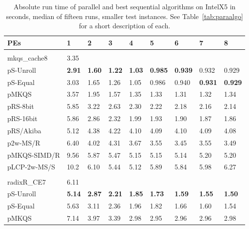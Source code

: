 \documentclass[a4paper]{myjournal}
\begin{document}
\begin{table}\centering\small
\caption{Absolute run time of parallel and best sequential algorithms on IntelX5 in seconds, median of fifteen runs, smaller test instances. See Table~\ref{tab:paraalgo} for a short description of each.}\label{tab:absrun-IntelX5b}
\begin{tabularx}{\linewidth}{l|*{8}{>{\hfill}X}|@{}}
PEs          & 1   & 2 & 3 & 4 & 5 & 6 & 7 & 8                                                                                      \\ \hline
& \multicolumn{8}{l|}{\textbf{Sinha URLs} (complete), , , } \\ \cline{2-9}
mkqs\_cache8 & 3.35 &  &  &  &  &  &  &  \\
pS-Unroll & \bf 2.91 & \bf 1.60 & \bf 1.22 & \bf 1.03 & \bf 0.985 & \bf 0.939 &     0.932 &     0.929 \\
 pS-Equal &     3.03 &     1.65 &     1.26 &     1.05 &     0.986 &     0.940 & \bf 0.931 & \bf 0.929 \\
        pMKQS &     3.57 &     1.95 &     1.57 &     1.35 &      1.33 &      1.31 &      1.32 &      1.34 \\
     pRS-8bit &     5.85 &     3.22 &     2.63 &     2.30 &      2.22 &      2.18 &      2.16 &      2.14 \\
    pRS-16bit &     5.86 &     2.86 &     2.32 &     1.99 &      1.93 &      1.90 &      1.87 &      1.86 \\
    pRS/Akiba &     5.12 &     4.38 &     4.22 &     4.10 &      4.09 &      4.10 &      4.09 &      4.08 \\
     p2w-MS/R &     6.40 &     4.02 &     4.31 &     3.67 &      3.55 &      3.45 &      3.55 &      3.49 \\
 pMKQS-SIMD/R &     9.56 &     5.87 &     5.47 &     5.15 &      5.15 &      5.14 &      5.20 &      5.20 \\
 pLCP-2w-MS/S &     10.2 &     6.10 &     5.44 &     5.12 &      5.89 &      5.84 &      5.98 &      6.27 \\ \hline
& \multicolumn{8}{l|}{\textbf{Sinha DNA} (complete), , , } \\ \cline{2-9}
radixR\_CE7 & 6.11 &  &  &  &  &  &  &  \\
pS-Unroll & \bf 5.14 & \bf 2.87 & \bf 2.21 & \bf 1.85 & \bf 1.73 & \bf 1.59 & \bf 1.55 & \bf 1.50 \\
 pS-Equal &     5.63 &     3.11 &     2.36 &     1.96 &     1.82 &     1.66 &     1.60 &     1.54 \\
        pMKQS &     7.14 &     3.97 &     3.39 &     2.98 &     2.95 &     2.96 &     2.96 &     2.98 \\

\end{tabularx}
\end{table}
\end{document}
